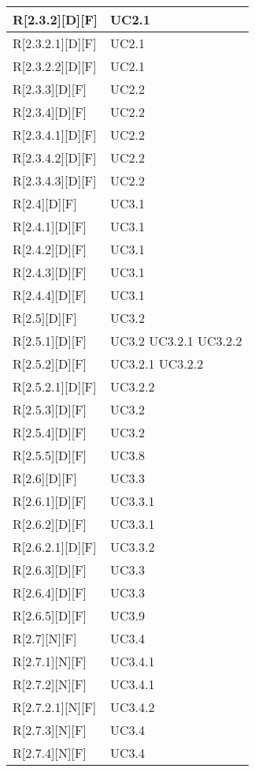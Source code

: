 \begin{longtable}{X | X}
\hline
R[2.3.2][D][F] & UC2.1 \\
\hline
R[2.3.2.1][D][F] & UC2.1 \\
\hline
R[2.3.2.2][D][F] & UC2.1 \\
\hline
R[2.3.3][D][F] & UC2.2 \\
\hline
R[2.3.4][D][F] & UC2.2 \\
\hline
R[2.3.4.1][D][F] & UC2.2 \\
\hline
R[2.3.4.2][D][F] & UC2.2 \\
\hline
R[2.3.4.3][D][F] & UC2.2 \\
\hline
R[2.4][D][F] & UC3.1 \\
\hline
R[2.4.1][D][F] & UC3.1 \\
\hline
R[2.4.2][D][F] & UC3.1 \\
\hline
R[2.4.3][D][F] & UC3.1 \\
\hline
R[2.4.4][D][F] & UC3.1 \\
\hline
R[2.5][D][F] & UC3.2 \\
\hline
R[2.5.1][D][F] & UC3.2 \newline UC3.2.1 \newline UC3.2.2 \\
\hline
R[2.5.2][D][F] & UC3.2.1 \newline UC3.2.2 \\
\hline
R[2.5.2.1][D][F] & UC3.2.2 \\
\hline
R[2.5.3][D][F] & UC3.2 \\
\hline
R[2.5.4][D][F] & UC3.2 \\
\hline
R[2.5.5][D][F] & UC3.8 \\
\hline
R[2.6][D][F] & UC3.3 \\
\hline
R[2.6.1][D][F] & UC3.3.1 \\
\hline
R[2.6.2][D][F] & UC3.3.1 \\
\hline
R[2.6.2.1][D][F] & UC3.3.2 \\
\hline
R[2.6.3][D][F] & UC3.3 \\
\hline
R[2.6.4][D][F] & UC3.3 \\
\hline
R[2.6.5][D][F] & UC3.9 \\
\hline
R[2.7][N][F] & UC3.4 \\
\hline
R[2.7.1][N][F] & UC3.4.1 \\
\hline
R[2.7.2][N][F] & UC3.4.1 \\
\hline
R[2.7.2.1][N][F] & UC3.4.2 \\
\hline
R[2.7.3][N][F] & UC3.4 \\
\hline
R[2.7.4][N][F] & UC3.4 \\

\end{longtable}
